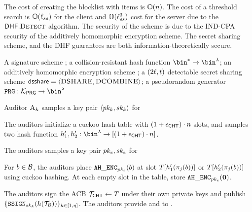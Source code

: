%
The cost of creating the blocklist with \blocklistSize items is $\mathbb{O}(n)$. The cost of a threshold search is $\mathbb{O}(\ell_{ss})$ for the client and $\mathbb{O}(\ell_{ss}^3)$ cost for the server due to the $\dhf.\dhfDetect$ algorithm. The security of the scheme is due to the IND-CPA security of the additively homomorphic encryption scheme. The secret sharing scheme, and the DHF guarantees are both information-theoretically secure.

\newcommand{\prgSeed}[1]{\ensuremath{\kappa_{#1}}\xspace}
\newcommand{\prgSeedAlt}[1]{\ensuremath{\kappa^{'}_{#1}}\xspace}

\begin{algorithm}
\caption{\chtACB: Encrypted Hash Table Based Blocklist}
\label{acb:cht}
\footnotesize
\begin{algorithmic}[1]

\Require A signature scheme \sigSchemeDefn; a collision-resistant hash function $\bin^{\ast} \rightarrow \bin^{\secParam}$; an additively homomorphic encryption scheme \ahencryptionSchemeDefn; a $(2\ell, t)$ detectable secret sharing scheme $\mathsf{dsshare} = \langle \textsc{DSHARE}, \textsc{DCOMBINE}\rangle $; a pseudorandom generator $\prg: \prgKeySpace \rightarrow \bin^{\secParam}$

\Statex \Procedure{\publishList}{\blocklist}

\State Auditor $\auditor[\auditorIdx]$ samples a key pair $\langle \auditorPubKeyGenericScheme[\auditorIdx], \auditorPrivKeyGenericScheme[\auditorIdx] \rangle$ for \sigScheme


\State The auditors initialize a cuckoo hash table \cuckooTable with $(1 + \epsilon_{\mathsf{CHT}}) \cdot n$ slots, and samples two hash function $\cuckooHashFn{1}, \cuckooHashFn{2}: \bin^{\secParam} \rightarrow \nats[(1 + \cuckooTableParam) \cdot \blocklistSize]$. 

\State The auditors samples a key pair $\encryptPubKey, \encryptPrivKey$ for \ahencryptionScheme


\State For $\genericBlocklistElmt \in \blocklist$, the auditors place $\ahencrypt[\encryptPubKey](\genericBlocklistElmt)$ at slot $\cuckooTable[\cuckooHashFn{1}(\projFn[\projIdx](\genericBlocklistElmt))]$ or $\cuckooTable[\cuckooHashFn{2}(\projFn[\projIdx](\genericBlocklistElmt))]$ using cuckoo hashing. At each empty slot in the table, store $\ahencrypt[\encryptPubKey](\groupIdentity)$.

\State The auditors sign the ACB $\mathcal{T}_{\mathsf{CHT}} \gets T$ under their own private keys and publish $\{\signGenSig[\auditorPrivKeyGenericScheme[\auditorIdx]](\hashFn(\blklistToken))\}_{\auditorIdx \in [1, \numAuditors]}$. The auditors provide \blocklist and \encryptPrivKey to \server. 



\end{algorithmic}
\end{algorithm}
